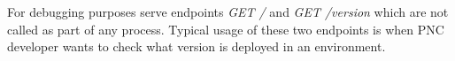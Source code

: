 \documentclass[../main.tex]{subfiles}
\begin{document}
For debugging purposes serve endpoints \textit{GET /} and \textit{GET /version} which are not called as part of any process. Typical usage of these two endpoints is when PNC developer wants to check what version is deployed in an environment.
\end{document}
